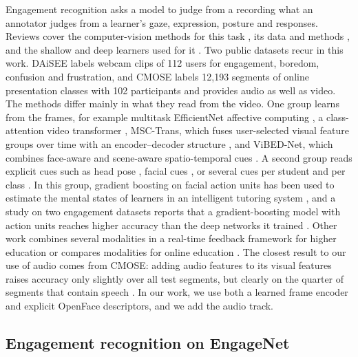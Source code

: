 \documentclass[pdflatex,iicol,sn-basic]{sn-jnl}
\begin{document}
Engagement recognition asks a model to judge from a recording what an annotator judges from a learner's gaze, expression, posture and responses. Reviews cover the computer-vision methods for this task \citep{qarbal2025review}, its data and methods \citep{mandia2023review}, and the shallow and deep learners used for it \citep{theophilus2026review}. Two public datasets recur in this work. DAiSEE \citep{gupta2016daisee} labels webcam clips of 112 users for engagement, boredom, confusion and frustration, and CMOSE \citep{wu2024cmose} labels 12,193 segments of online presentation classes with 102 participants and provides audio as well as video. The methods differ mainly in what they read from the video. One group learns from the frames, for example multitask EfficientNet affective computing \citep{thiruthuvanathan2024multitask}, a class-attention video transformer \citep{ai2024classattention}, MSC-Trans, which fuses user-selected visual feature groups over time with an encoder--decoder structure \citep{xie2025msctrans}, and ViBED-Net, which combines face-aware and scene-aware spatio-temporal cues \citep{gothwal2025vibednet}. A second group reads explicit cues such as head pose \citep{mo2024headpose}, facial cues \citep{gupta2023facialcues}, or several cues per student and per class \citep{pabba2023multicues}. In this group, gradient boosting on facial action units has been used to estimate the mental states of learners in an intelligent tutoring system \citep{wang2026shap}, and a study on two engagement datasets reports that a gradient-boosting model with action units reaches higher accuracy than the deep networks it trained \citep{das2025optimizing}. Other work combines several modalities in a real-time feedback framework for higher education \citep{zhao2026multimodal} or compares modalities for online education \citep{immadisetty2025multimodality}. The closest result to our use of audio comes from CMOSE: adding audio features to its visual features raises accuracy only slightly over all test segments, but clearly on the quarter of segments that contain speech \citep{wu2024cmose}. In our work, we use both a learned frame encoder and explicit OpenFace descriptors, and we add the audio track.

\subsection{Engagement recognition on EngageNet}\label{sec:rw_engagenet}
\end{document}
